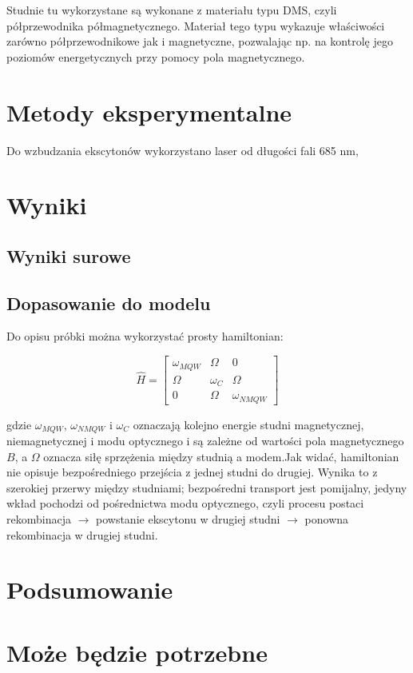 \documentclass[licencjacka]{pracamgr}
\begin{document}
Studnie tu wykorzystane są wykonane z materiału typu DMS, czyli półprzewodnika półmagnetycznego. Materiał tego typu wykazuje właściwości zarówno półprzewodnikowe jak i magnetyczne, pozwalając np. na kontrolę jego poziomów energetycznych przy pomocy pola magnetycznego.

\chapter{Metody eksperymentalne}\label{r:metody}
Do wzbudzania ekscytonów wykorzystano laser od długości fali 685 nm, 


\chapter{Wyniki}\label{r:wyniki}

\section{Wyniki surowe}

\section{Dopasowanie do modelu}
 Do opisu próbki można wykorzystać prosty hamiltonian:

\begin{equation}
\hat{H}=
\begin{bmatrix}
\omega_{MQW} & \Omega &0 \\
\Omega & \omega_{C} & \Omega \\
0 & \Omega & \omega_{NMQW}
\end{bmatrix}  
\end{equation}

gdzie $\omega_{MQW}$, $\omega_{NMQW}$ i $\omega_{C}$ oznaczają kolejno energie studni magnetycznej, niemagnetycznej i modu optycznego i są zależne od wartości pola magnetycznego $B$, a $\Omega$ oznacza siłę sprzężenia między studnią a modem.Jak widać, hamiltonian nie opisuje bezpośredniego przejścia z jednej studni do drugiej. Wynika to z szerokiej przerwy między studniami; bezpośredni transport jest pomijalny, jedyny wkład pochodzi od pośrednictwa modu optycznego, czyli procesu postaci rekombinacja $\rightarrow$ powstanie ekscytonu w drugiej studni $\rightarrow$ ponowna rekombinacja w drugiej studni.%



\chapter{Podsumowanie}


\appendix

\chapter{Może będzie potrzebne}



\end{document}
